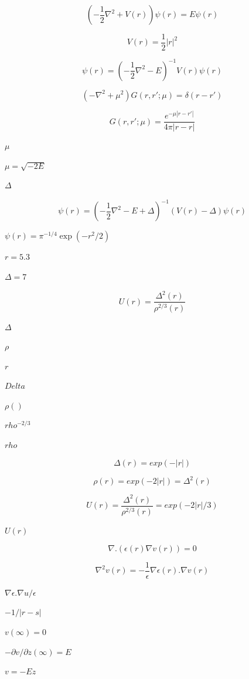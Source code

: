 \documentclass{article}
\begin{document}
\[
\left( -\frac{1}{2} \nabla^2 + V(r) \right) \psi(r) = E \psi(r)
\]
\pagebreak

\[
V(r) = \frac{1}{2} |r|^2
\]
\pagebreak

\[
\psi(r) = \left( -\frac{1}{2} \nabla^2 - E \right)^{-1} V(r) \psi(r)
\]
\pagebreak

\[
\left(-\nabla^2 + \mu^2 \right) G(r,r'; \mu) = \delta(r-r')
\]
\pagebreak

\[
G(r,r'; \mu) = \frac{e^{-\mu |r-r'|}}{4 \pi |r-r|}
\]
\pagebreak

$\mu$
\pagebreak

$\mu = \sqrt{-2 E}$
\pagebreak

$\Delta$
\pagebreak

\[
\psi(r) = \left( -\frac{1}{2} \nabla^2 - E + \Delta \right)^{-1} \left( V(r) -\Delta\right)  \psi(r)
\]
\pagebreak

$\psi(r)=\pi^{-1/4}\exp(-r^2 / 2)$
\pagebreak

$r=5.3$
\pagebreak

$\Delta=7$
\pagebreak

\[
U(r) = \frac{\Delta^2 (r)}{\rho^{2/3} (r)}
\]
\pagebreak

$ \Delta $
\pagebreak

$ \rho $
\pagebreak

$ r $
\pagebreak

$ Delta $
\pagebreak

$ \rho() $
\pagebreak

$ rho^{-2/3} $
\pagebreak

$ rho $
\pagebreak

\[
\Delta(r) = exp(- | r | )
\]
\pagebreak

\[
\rho(r) = exp(- 2 | r | ) = \Delta^2(r)
\]
\pagebreak

\[
U(r) = \frac{\Delta^2 (r)}{\rho^{2/3} (r)} = exp( - 2 | r | / 3)
\]
\pagebreak

$
U(r) $
\pagebreak

\[
\nabla . \left( \epsilon(r) \nabla v(r)  \right) = 0
\]
\pagebreak

\[
   \nabla^2 v(r) = - \frac{1}{\epsilon} \nabla \epsilon(r) .  \nabla v(r)
\]
\pagebreak

$\nabla \epsilon . \nabla u / \epsilon$
\pagebreak

$-1 / |r-s|$
\pagebreak

$v(\infty)=0$
\pagebreak

$- \partial v / \partial z(\infty) = E$
\pagebreak

$v = - E z$
\pagebreak
\end{document}
